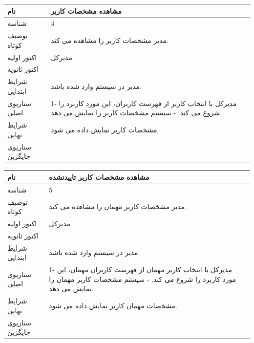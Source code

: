\begin{tabular}{|p{2cm}|p{10cm}|}
\hline
نام
&
مشاهده مشخصات کاربر
\\
\hline
شناسه
&
4
\\
\hline
توصیف کوتاه
&
مدیر مشخصات کاربر را مشاهده می کند.
\\
\hline
اکتور اولیه
&
مدیرکل
\\
\hline
اکتور ثانویه
&

\\
\hline
شرایط ابتدایی
&
مدیر در سیستم وارد شده باشد.
\\
\hline
سناریوی اصلی
&
1-	مدیرکل با انتخاب کاربر از فهرست کاربران، این مورد کاربرد را شروع می کند.
\newline
2-	سیستم مشخصات کاربر را نمایش می دهد.
\\
\hline
شرایط نهایی
&
مشخصات کاربر نمایش داده می شود.
\\
\hline
سناریوی جایگزین
&

\\
\hline
\end{tabular}

\vspace{2cm}

\begin{tabular}{|p{2cm}|p{10cm}|}
\hline
نام
&
مشاهده مشخصات کاربر تاییدنشده
\\
\hline
شناسه
&
5
\\
\hline
توصیف کوتاه
&
مدیر مشخصات کاربر مهمان را مشاهده می کند.
\\
\hline
اکتور اولیه
&
مدیرکل
\\
\hline
اکتور ثانویه
&

\\
\hline
شرایط ابتدایی
&
مدیر در سیستم وارد شده باشد.
\\
\hline
سناریوی اصلی
&
1-	مدیرکل با انتخاب کاربر مهمان از فهرست کاربران مهمان، این مورد کاربرد را شروع می کند.
\newline
2-	سیستم مشخصات کاربر مهمان را نمایش می دهد.
\\
\hline
شرایط نهایی
&
مشخصات مهمان کاربر نمایش داده می شود.
\\
\hline
سناریوی جایگزین
&

\\
\hline
\end{tabular}

\vspace{2cm}

